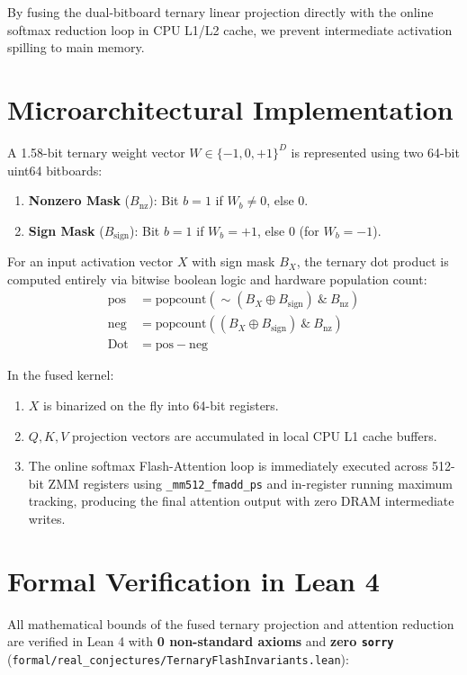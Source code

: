 \documentclass[10pt,twocolumn,letterpaper]{article}
\begin{document}
By fusing the dual-bitboard ternary linear projection directly with the online softmax reduction loop in CPU L1/L2 cache, we prevent intermediate activation spilling to main memory.

\section{Microarchitectural Implementation}

A 1.58-bit ternary weight vector $W \in \{-1, 0, +1\}^D$ is represented using two 64-bit uint64 bitboards:
\begin{enumerate}
    \item \textbf{Nonzero Mask} ($B_{\text{nz}}$): Bit $b=1$ if $W_b \ne 0$, else $0$.
    \item \textbf{Sign Mask} ($B_{\text{sign}}$): Bit $b=1$ if $W_b = +1$, else $0$ (for $W_b = -1$).
\end{enumerate}

For an input activation vector $X$ with sign mask $B_X$, the ternary dot product is computed entirely via bitwise boolean logic and hardware population count:
\begin{align}
\text{pos} &= \text{popcount}\left(\sim (B_X \oplus B_{\text{sign}}) \ \& \ B_{\text{nz}}\right) \\
\text{neg} &= \text{popcount}\left((B_X \oplus B_{\text{sign}}) \ \& \ B_{\text{nz}}\right) \\
\text{Dot} &= \text{pos} - \text{neg}
\end{align}

In the fused kernel:
\begin{enumerate}
    \item $X$ is binarized on the fly into 64-bit registers.
    \item $Q, K, V$ projection vectors are accumulated in local CPU L1 cache buffers.
    \item The online softmax Flash-Attention loop is immediately executed across 512-bit ZMM registers using \texttt{\_mm512\_fmadd\_ps} and in-register running maximum tracking, producing the final attention output with zero DRAM intermediate writes.
\end{enumerate}

\section{Formal Verification in Lean 4}

All mathematical bounds of the fused ternary projection and attention reduction are verified in Lean 4 with \textbf{0 non-standard axioms} and \textbf{zero \texttt{sorry}} (\texttt{formal/real\_conjectures/TernaryFlashInvariants.lean}):
\end{document}
